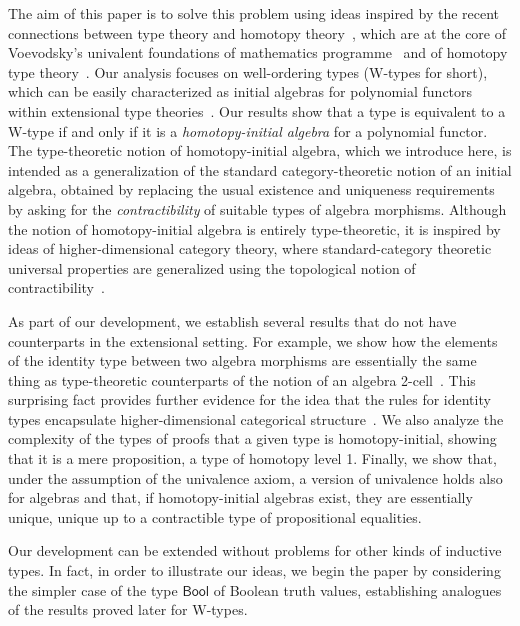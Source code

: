 \documentclass[10pt,a4paper,oneside,reqno]{amsart}
\numberwithin{equation}{section}
\theoremstyle{mythm}
\theoremstyle{mydef}
\theoremstyle{myrmk}
\newcommand{\ie}{\text{i.e.\ }}
\newcommand{\Bool}{\mathsf{Bool}}
\begin{document}
The aim of this paper is to solve this problem using ideas inspired by the
recent connections 
between type theory and homotopy theory~\cite{AwodeyS:homtmi,ssets}, which are at the core of 
Voevodsky's univalent foundations of mathematics programme~\cite{VoevodskyV:notts} and of
homotopy type theory~\cite{hott}. Our analysis
focuses on well-ordering types (W-types for short),
which can be easily characterized as initial algebras for polynomial functors
within extensional type
theories~\cite{AbbottM:concsp,DybjerP:repids,GambinoN:weltdp,MoerdijkI:weltc}. Our
results show that a type is equivalent to a W-type if and only if
it is a \emph{homotopy-initial algebra} for a polynomial functor. The type-theoretic notion of homotopy-initial
algebra, which we introduce here, is intended as a generalization of the standard category-theoretic
notion of an initial algebra, obtained by replacing the usual existence and uniqueness requirements
by asking for the \emph{contractibility} of suitable types of algebra morphisms. Although the notion 
of homotopy-initial algebra is entirely type-theoretic, it is inspired by ideas of higher-dimensional
category theory, where standard-category theoretic universal properties are generalized using the topological
 notion of contractibility~\cite{LurieJ:higtt}. 

As part of our development, we establish several results that do not have counterparts in the extensional setting.  
For  example, we show how the elements of the identity type between two algebra morphisms are essentially
the same thing as type-theoretic counterparts of the notion of an algebra 2-cell~\cite{BlackwellR:twodmt}.
This surprising fact provides further evidence for the idea that the rules for identity types encapsulate 
higher-dimensional categorical structure~\cite{LumsdaineP:weaci,vandenBergB:typwg}. We also
analyze the complexity of the types of proofs that a given type is homotopy-initial, showing that it
is a mere proposition, \ie a type of homotopy level 1. Finally, we show that, 
under the assumption of the univalence axiom, a version of univalence holds also for
algebras and that, if homotopy-initial algebras  exist, they are
essentially unique, \ie unique up to a contractible type of propositional equalities. 

Our development can be extended without problems for other kinds of inductive types.
In fact, in order to illustrate our ideas,  we begin the paper by considering the simpler case
of the type $\Bool$ of Boolean truth values, establishing analogues of the results proved
later for W-types. 
\end{document}
